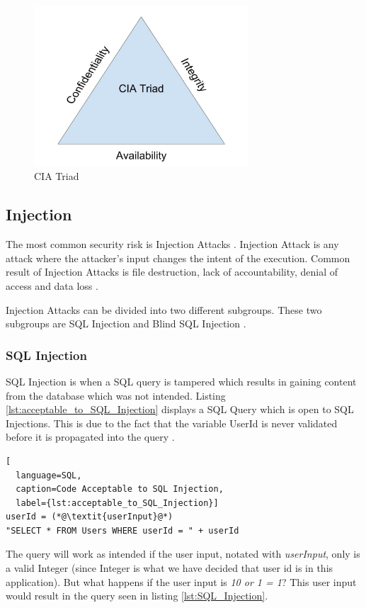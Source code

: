 \begin{figure}
	\centering
	\includegraphics[height=6cm]{images/CIATriad.jpg}
	\caption{CIA Triad}
	\label{fig:CIATriad}
\end{figure}


\subsection{Injection}
The most common security risk is Injection Attacks \parencite{OWASP2017}. Injection Attack is any attack where the attacker's input changes the intent of the execution. Common result of Injection Attacks is file destruction, lack of accountability, denial of access and data loss \parencite{Secure_Web}.

Injection Attacks can be divided into two different subgroups. These two subgroups are SQL Injection and Blind SQL Injection \parencite{Secure_Web}.


\subsubsection{SQL Injection}
SQL Injection is when a SQL query is tampered which results in gaining content from the database which was not intended. Listing \ref{lst:acceptable_to_SQL_Injection} displays a SQL Query which is open to SQL Injections. This is due to the fact that the variable UserId is never validated before it is propagated into the query \parencite{JustinClarke-Salt2009SIAa, Secure_Web}.

\hfill
\begin{lstlisting}[
  language=SQL,
  caption=Code Acceptable to SQL Injection,
  label={lst:acceptable_to_SQL_Injection}]
userId = (*@\textit{userInput}@*)
"SELECT * FROM Users WHERE userId = " + userId
\end{lstlisting}
\hfill

The query will work as intended if the user input, notated with \textit{userInput}, only is a valid Integer (since Integer is what we have decided that user id is in this application). But what happens if the user input is \textit{10 or 1 = 1}? This user input would result in the query seen in listing \ref{lst:SQL_Injection}.

